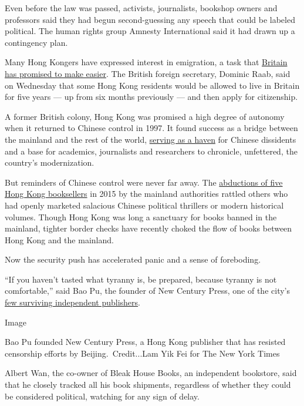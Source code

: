 Even before the law was passed, activists, journalists, bookshop owners
and professors said they had begun second-guessing any speech that could
be labeled political. The human rights group Amnesty International said
it had drawn up a contingency plan.

Many Hong Kongers have expressed interest in emigration, a task that
\href{https://www.nytimes3xbfgragh.onion/2020/06/03/world/europe/boris-johnson-uk-hong-kong-china.html}{Britain
has promised to make easier}. The British foreign secretary, Dominic
Raab, said on Wednesday that some Hong Kong residents would be allowed
to live in Britain for five years --- up from six months previously ---
and then apply for citizenship.

A former British colony, Hong Kong was promised a high degree of
autonomy when it returned to Chinese control in 1997. It found success
as a bridge between the mainland and the rest of the world,
\href{https://www.nytimes3xbfgragh.onion/2019/06/18/world/asia/hong-kong-extradition-bill-china.html}{serving
as a haven} for Chinese dissidents and a base for academics, journalists
and researchers to chronicle, unfettered, the country's modernization.

But reminders of Chinese control were never far away. The
\href{https://www.nytimes3xbfgragh.onion/2018/04/03/magazine/the-case-of-hong-kongs-missing-booksellers.html}{abductions
of five Hong Kong booksellers} in 2015 by the mainland authorities
rattled others who had openly marketed salacious Chinese political
thrillers or modern historical volumes. Though Hong Kong was long a
sanctuary for books banned in the mainland, tighter border checks have
recently choked the flow of books between Hong Kong and the mainland.

Now the security push has accelerated panic and a sense of foreboding.

``If you haven't tasted what tyranny is, be prepared, because tyranny is
not comfortable,'' said Bao Pu, the founder of New Century Press, one of
the city's
\href{https://www.nytimes3xbfgragh.onion/2019/06/04/books/hong-kong-publishing-tiananmen.html}{few
surviving independent publishers}.

Image

Bao Pu founded New Century Press, a Hong Kong publisher that has
resisted censorship efforts by Beijing.~Credit...Lam Yik Fei for The New
York Times

Albert Wan, the co-owner of Bleak House Books, an independent bookstore,
said that he closely tracked all his book shipments, regardless of
whether they could be considered political, watching for any sign of
delay.

